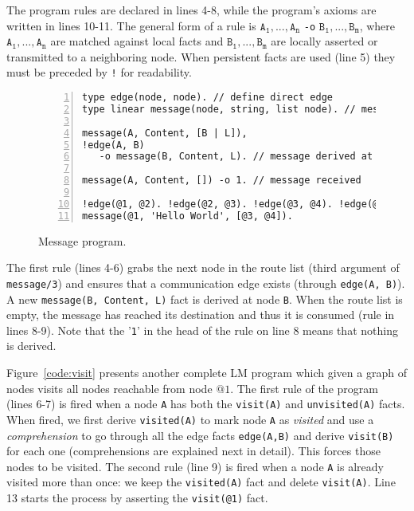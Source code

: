The program rules are declared in lines 4-8, while the program's axioms are written in lines 10-11.
The general form of a rule is $\mathtt{A_1},...,\mathtt{A_n}$ \texttt{-o} $\mathtt{B_1},...,\mathtt{B_m}$, where $\mathtt{A_1},...,\mathtt{A_n}$ are matched against local facts and $\mathtt{B_1},...,\mathtt{B_m}$ are locally asserted or transmitted to a neighboring node.
When persistent facts are used (line 5) they must be
preceded by \texttt{!} for readability.

\begin{figure}[h!]
\small\begin{Verbatim}[numbers=left]
type edge(node, node). // define direct edge
type linear message(node, string, list node). // message format

message(A, Content, [B | L]),
!edge(A, B)
   -o message(B, Content, L). // message derived at node B

message(A, Content, []) -o 1. // message received

!edge(@1, @2). !edge(@2, @3). !edge(@3, @4). !edge(@1, @3).
message(@1, 'Hello World', [@3, @4]).
\end{Verbatim}
\caption{Message program.}
  \label{code:message}
\end{figure}

The first rule (lines 4-6) grabs the next node in the route list (third argument of \texttt{message/3}) and
ensures that a communication edge exists (through \texttt{edge(A, B)}).
A new \texttt{message(B,~Content,~L)} fact is derived at node \texttt{B}.
When the route list is empty, the message has reached its destination and thus it is consumed
(rule in lines 8-9). Note that the '\texttt{1}' in the head of the rule on line 8 means that nothing is derived.

Figure~\ref{code:visit} presents another complete LM program which given a graph
of nodes visits all nodes reachable from node $@1$.
The first rule of the program (lines 6-7) is fired when a node \texttt{A} has both the \texttt{visit(A)} and \texttt{unvisited(A)} facts.
When fired, we first derive \texttt{visited(A)} to mark node \texttt{A} as \textit{visited} and use a
\emph{comprehension} to go through all the edge facts \texttt{edge(A,B)} and derive \texttt{visit(B)} for each
one (comprehensions are explained next in detail). This forces those nodes to be visited.
The second rule (line 9) is fired when a
node \texttt{A} is already visited more than once: we keep the \texttt{visited(A)} fact and delete \texttt{visit(A)}.
Line 13 starts the process by asserting the \texttt{visit(@1)} fact.

